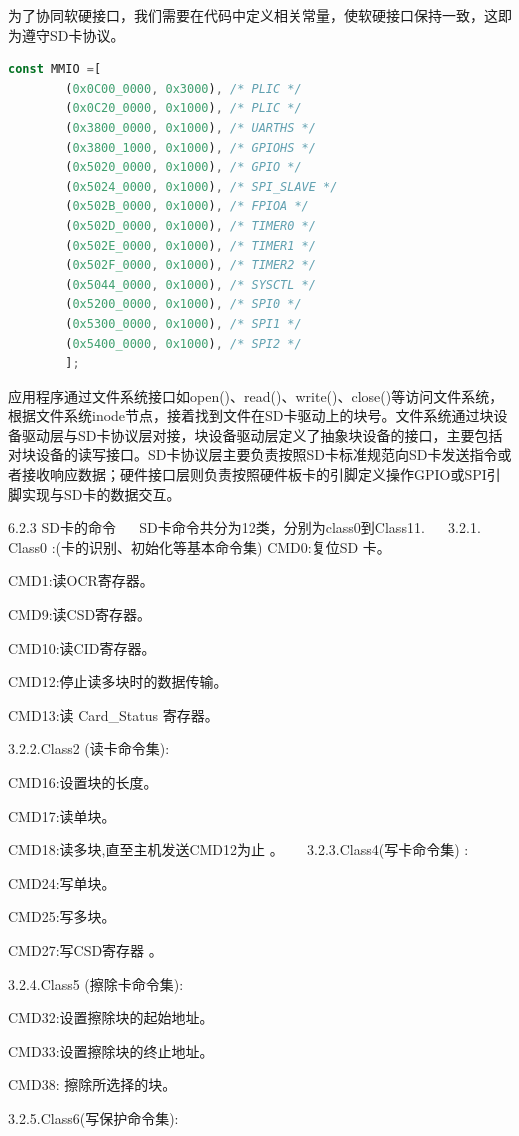 为了协同软硬接口，我们需要在代码中定义相关常量，使软硬接口保持一致，这即为遵守SD卡协议。
\begin{lstlisting}[language={Rust}, label={code:inode},
	caption={SD卡协议}]
    const MMIO =[
        (0x0C00_0000, 0x3000), /* PLIC */
        (0x0C20_0000, 0x1000), /* PLIC */
        (0x3800_0000, 0x1000), /* UARTHS */
        (0x3800_1000, 0x1000), /* GPIOHS */
        (0x5020_0000, 0x1000), /* GPIO */
        (0x5024_0000, 0x1000), /* SPI_SLAVE */
        (0x502B_0000, 0x1000), /* FPIOA */
        (0x502D_0000, 0x1000), /* TIMER0 */
        (0x502E_0000, 0x1000), /* TIMER1 */
        (0x502F_0000, 0x1000), /* TIMER2 */
        (0x5044_0000, 0x1000), /* SYSCTL */
        (0x5200_0000, 0x1000), /* SPI0 */
        (0x5300_0000, 0x1000), /* SPI1 */
        (0x5400_0000, 0x1000), /* SPI2 */
        ];
\end{lstlisting}


应用程序通过文件系统接口如open()、read()、write()、close()等访问文件系统，根据文件系统inode节点，接着找到文件在SD卡驱动上的块号。文件系统通过块设备驱动层与SD卡协议层对接，块设备驱动层定义了抽象块设备的接口，主要包括对块设备的读写接口。SD卡协议层主要负责按照SD卡标准规范向SD卡发送指令或者接收响应数据；硬件接口层则负责按照硬件板卡的引脚定义操作GPIO或SPI引脚实现与SD卡的数据交互。

6.2.3 SD卡的命令
　
SD卡命令共分为12类，分别为class0到Class11.
　
3.2.1. Class0 :(卡的识别、初始化等基本命令集)
CMD0:复位SD 卡。

CMD1:读OCR寄存器。

CMD9:读CSD寄存器。

CMD10:读CID寄存器。

CMD12:停止读多块时的数据传输。

CMD13:读 Card_Status 寄存器。

3.2.2.Class2 (读卡命令集):

CMD16:设置块的长度。

CMD17:读单块。

CMD18:读多块,直至主机发送CMD12为止 。
　
3.2.3.Class4(写卡命令集) :

CMD24:写单块。

CMD25:写多块。

CMD27:写CSD寄存器 。

3.2.4.Class5 (擦除卡命令集):

CMD32:设置擦除块的起始地址。

CMD33:设置擦除块的终止地址。

CMD38: 擦除所选择的块。


3.2.5.Class6(写保护命令集):


